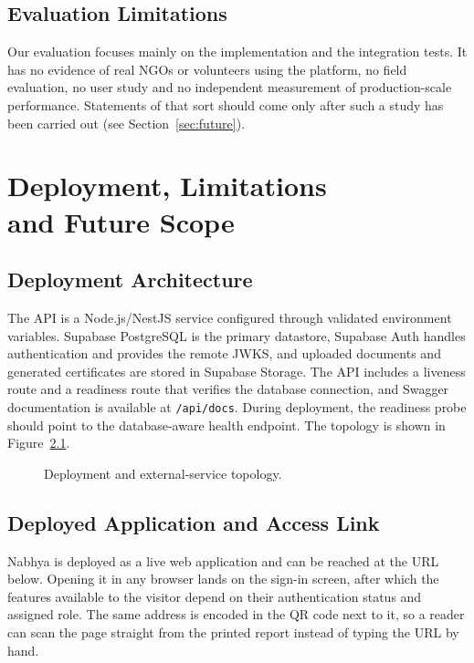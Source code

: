 \section{Evaluation Limitations}
Our evaluation focuses mainly on the implementation and the integration tests. It has no evidence of real NGOs or volunteers using the platform, no field evaluation, no user study and no independent measurement of production-scale performance. Statements of that sort should come only after such a study has been carried out (see Section~\ref{sec:future}).

\chapter[Deployment, Limitations and Future Scope]{Deployment, Limitations\\and Future Scope}
\label{ch:deployment}

\section{Deployment Architecture}
The API is a Node.js/NestJS service configured through validated environment variables. Supabase PostgreSQL is the primary datastore, Supabase Auth handles authentication and provides the remote JWKS, and uploaded documents and generated certificates are stored in Supabase Storage. The API includes a liveness route and a readiness route that verifies the database connection, and Swagger documentation is available at \texttt{/api/docs}. During deployment, the readiness probe should point to the database-aware health endpoint. The topology is shown in Figure~\ref{fig:deployment}.

\begin{figure}[H]
    \centering
    \caption{Deployment and external-service topology.}
    \label{fig:deployment}
\end{figure}

\section{Deployed Application and Access Link}
\label{sec:deployment-link}

Nabhya is deployed as a live web application and can be reached at the URL below. Opening it in any browser lands on the sign-in screen, after which the features available to the visitor depend on their authentication status and assigned role. The same address is encoded in the QR code next to it, so a reader can scan the page straight from the printed report instead of typing the URL by hand.

